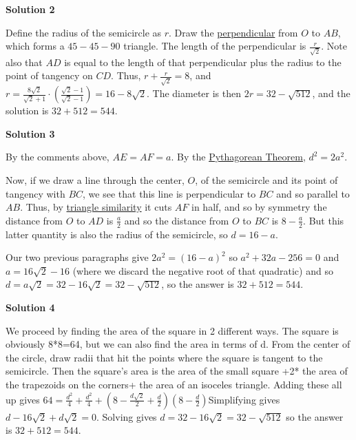 \begin{enumerate}
\textbf{Solution 2}

Define the radius of the semicircle as $r$. Draw the \href{https://artofproblemsolving.com/wiki/index.php?title=Perpendicular}{perpendicular} from $O$ to $AB$, which forms a $45-45-90$ triangle. The length of the perpendicular is $\frac{r}{\sqrt{2}}$. Note also that $AD$ is equal to the length of that perpendicular plus the radius to the point of tangency on $CD$. Thus, $r + \frac{r}{\sqrt{2}} = 8$, and $r = \frac{8\sqrt{2}}{\sqrt{2} + 1} \cdot (\frac{\sqrt{2} - 1}{\sqrt{2} - 1}) = 16 - 8\sqrt{2}$. The diameter is then $2r = 32 - \sqrt{512}$, and the solution is $32 + 512 = 544$.

 



\textbf{Solution 3}

By the comments above, $AE = AF = a$.  By the \href{https://artofproblemsolving.com/wiki/index.php?title=Pythagorean\_Theorem}{Pythagorean Theorem}, $d^2 = 2a^2$.

 Now, if we draw a line through the center, $O$, of the semicircle and its point of tangency with $BC$, we see that this line is perpendicular to $BC$ and so parallel to $AB$.  Thus, by \href{https://artofproblemsolving.com/wiki/index.php?title=Triangle\_similarity&action=edit&redlink=1}{triangle similarity} it cuts $AF$ in half, and so by symmetry the distance from $O$ to $AD$ is $\frac{a}{2}$ and so the distance from $O$ to $BC$ is $8 - \frac a2$.  But this latter quantity is also the radius of the semicircle, so $d = 16 - a$.

 Our two previous paragraphs give $2a^2 = (16 - a)^2$ so $a^2 + 32a - 256 = 0$ and $a = 16\sqrt{2} - 16$ (where we discard the negative root of that quadratic) and so $d = a\sqrt{2} = 32 - 16\sqrt{2} = 32 - \sqrt{512}$, so the answer is $32 + 512 = 544$.

 



\textbf{Solution 4}

We proceed by finding the area of the square in 2 different ways. The square is obviously 8*8=64, but we can also find the area in terms of d. From the center of the circle, draw radii that hit the points where the square is tangent to the semicircle. Then the square's area is the area of the small square +2* the area of the trapezoids on the corners+ the area of an isoceles triangle. Adding these all up gives $64=\frac{d^2}{4}+\frac{d^2}{4}+(8-\frac{d\sqrt{2}}{2}+\frac{d}{2})(8-\frac{d}{2})$Simplifying gives $d-16\sqrt{2}+d\sqrt{2}=0$. Solving gives $d=32-16\sqrt{2}=32-\sqrt{512}$ so the answer is $32+512= \boxed{544}$.


\end{enumerate}
